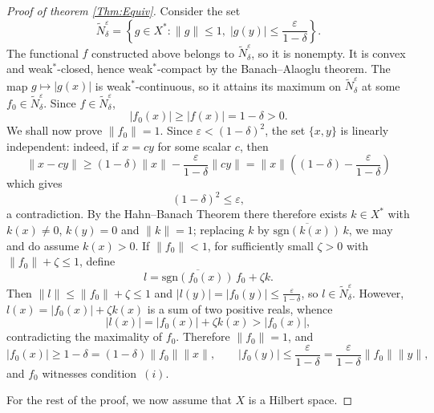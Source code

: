 \documentclass[11pt, reqno]{amsart}
\theoremstyle{definition}
\begin{document}
\begin{proof}[Proof of theorem \ref{Thm:Equiv}]
\noindent Consider the set
\[
\widetilde{N}^\varepsilon_\delta=\left\{g\in X^*:\|g\|\leq 1,\; 
|g(y)|\leq\frac{\varepsilon}{1-\delta}\right\}.
\]
The functional $f$ constructed above belongs to $\widetilde{N}^\varepsilon_\delta$, 
so it is nonempty. It is convex and weak$^*$-closed, hence 
weak$^*$-compact by the Banach--Alaoglu theorem. The map $g\mapsto|g(x)|$ 
is weak$^*$-continuous, so it attains its maximum on 
$\widetilde{N}^\varepsilon_\delta$ at some $f_0\in\widetilde{N}^\varepsilon_\delta$. 
Since $f\in\widetilde{N}^\varepsilon_\delta$,
\[
|f_0(x)|\geq|f(x)|=1-\delta>0.
\]
We shall now prove $\|f_0\|=1$. Since $\varepsilon < (1-\delta)^2$, the 
set $\{x, y\}$ is linearly independent: indeed, if $x = cy$ for some scalar 
$c$, then
\[
\|x-cy\|\geq (1-\delta)\|x\|-\frac{\varepsilon}{1-\delta}\|cy\|=\|x\|\left((1-\delta)-\frac{\varepsilon}{1-\delta}\right)
\]
which gives
\[
(1-\delta)^2\leq \varepsilon,
\]
a contradiction. By the Hahn--Banach Theorem there therefore exists 
$k \in X^*$ with $k(x) \neq 0$, $k(y) = 0$ and $\|k\| = 1$; 
 replacing $k$ by $\overline{\mathrm{sgn}(k(x))}\,k$, we may and do assume $k(x)>0$.
If $\|f_0\|<1$, for sufficiently small $\zeta>0$ with $\|f_0\|+\zeta\leq 1$, define
\[
l= \overline{\mathrm{sgn}(f_0(x))}\,f_0+\zeta k.
\]
Then $\|l\|\leq\|f_0\|+\zeta\leq 1$ and $|l(y)|=|f_0(y)|
\leq\frac{\varepsilon}{1-\delta}$, so $l\in\widetilde{N}^\varepsilon_\delta$. 
However,  $l(x)=|f_0(x)|+\zeta k(x)$ is a sum of two positive reals, 
whence
\[
|l(x)|=|f_0(x)|+\zeta  k(x)>|f_0(x)|,
\]
contradicting the maximality of $f_0$. Therefore $\|f_0\|=1$, and
\[
|f_0(x)|\geq 1-\delta=(1-\delta)\|f_0\|\|x\|,\qquad 
|f_0(y)|\leq\frac{\varepsilon}{1-\delta}=\frac{\varepsilon}{1-\delta}
\|f_0\|\|y\|,
\]
and $f_0$ witnesses condition~$(i)$.


\bigskip


\noindent For the rest of the proof, we now assume that $X$ is a Hilbert space. 


\bigskip





\end{proof}
\end{document}
